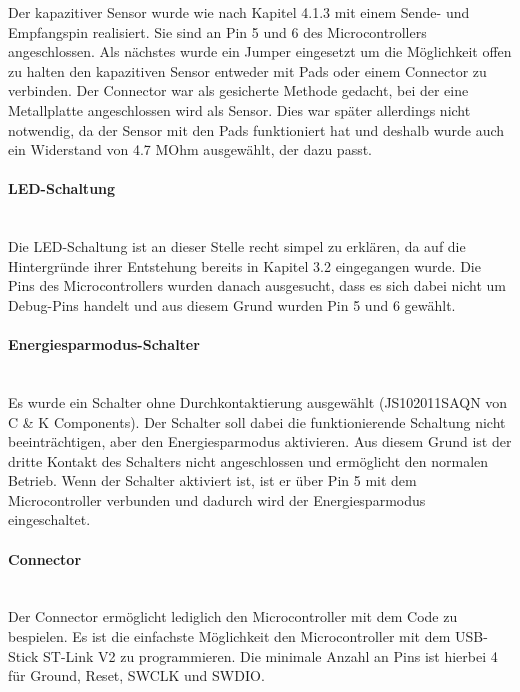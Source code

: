 \documentclass[a4paper,
DIV=13,
12pt,
BCOR=10mm,
department=FakEI,
parskip=half,
automark,
]{article}
\begin{document}
Der kapazitiver Sensor wurde wie nach Kapitel 4.1.3 mit einem Sende- und Empfangspin realisiert. Sie sind an Pin 5 und 6 des Microcontrollers angeschlossen. Als nächstes wurde ein Jumper eingesetzt um die Möglichkeit offen zu halten den kapazitiven Sensor entweder mit Pads oder einem Connector zu verbinden. Der Connector war als gesicherte Methode gedacht, bei der eine Metallplatte angeschlossen wird als Sensor. Dies war später allerdings nicht notwendig, da der Sensor mit den Pads funktioniert hat und deshalb wurde auch ein Widerstand von 4.7 MOhm ausgewählt, der dazu passt.

\paragraph{LED-Schaltung} $~$ \\

Die LED-Schaltung ist an dieser Stelle recht simpel zu erklären, da auf die Hintergründe ihrer Entstehung bereits in Kapitel 3.2 eingegangen wurde. 
Die Pins des Microcontrollers wurden danach ausgesucht, dass es sich dabei nicht um Debug-Pins handelt und aus diesem Grund wurden Pin 5 und 6 gewählt.

\paragraph{Energiesparmodus-Schalter} $~$ \\

Es wurde ein Schalter ohne Durchkontaktierung ausgewählt (JS102011SAQN von C \& K Components). Der Schalter soll dabei die funktionierende Schaltung nicht beeinträchtigen, aber den Energiesparmodus aktivieren. Aus diesem Grund ist der dritte Kontakt des Schalters nicht angeschlossen und ermöglicht den normalen Betrieb. Wenn der Schalter \glqq aktiviert\grqq{} ist, ist er über Pin 5 mit dem Microcontroller verbunden und dadurch wird der Energiesparmodus eingeschaltet. 


\paragraph{Connector} $~$ \\

Der Connector ermöglicht lediglich den Microcontroller mit dem Code zu bespielen. Es ist die einfachste Möglichkeit den Microcontroller mit dem USB-Stick ST-Link V2 zu programmieren. Die minimale Anzahl an Pins ist hierbei 4 für Ground, Reset, SWCLK und SWDIO.
\end{document}
